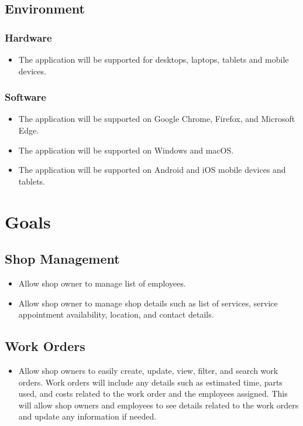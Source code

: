 \documentclass{article}
\begin{document}
\subsection{Environment}
\subsubsection{Hardware}
\begin{itemize}
    \item The application will be supported for desktops, laptops, tablets and mobile devices.
\end{itemize}
\subsubsection{Software}
\begin{itemize}
    \item The application will be supported on Google Chrome, Firefox, and Microsoft Edge.
    \item The application will be supported on Windows and macOS.
    \item The application will be supported on Android and iOS mobile devices and tablets.
\end{itemize}

\section{Goals}
\subsection{Shop Management}
\begin{itemize}
    \item Allow shop owner to manage list of employees.
    \item Allow shop owner to manage shop details such as list of services, service appointment availability, location, and contact details.
\end{itemize}

\subsection{Work Orders}
\begin{itemize}
    \item Allow shop owners to easily create, update, view, filter, and search work orders. Work orders will 
    include any details such as estimated time, parts used, and costs related to the work order and the employees 
    assigned. This will allow shop owners and employees to see details related to the work orders and update 
    any information if needed.
\end{itemize}
\end{document}
